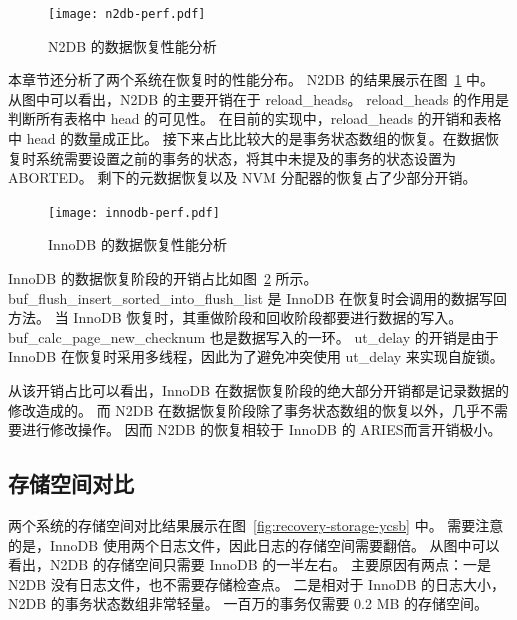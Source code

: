 \begin{figure}
    \centering
    \texttt{[image: n2db-perf.pdf]}
    \caption{N2DB 的数据恢复性能分析}
    \label{fig:recovery-n2db-perf}
\end{figure}

本章节还分析了两个系统在恢复时的性能分布。
N2DB 的结果展示在图~\ref{fig:recovery-n2db-perf} 中。
从图中可以看出，N2DB 的主要开销在于 reload\_heads。
reload\_heads 的作用是判断所有表格中 head 的可见性。
在目前的实现中，reload\_heads 的开销和表格中 head 的数量成正比。
接下来占比比较大的是事务状态数组的恢复。在数据恢复时系统需要设置之前的事务的状态，将其中未提及的事务的状态设置为 ABORTED。
剩下的元数据恢复以及 NVM 分配器的恢复占了少部分开销。

\begin{figure}
    \centering
    \texttt{[image: innodb-perf.pdf]}
    \caption{InnoDB 的数据恢复性能分析}
    \label{fig:recovery-innodb-perf}
\end{figure}


InnoDB 的数据恢复阶段的开销占比如图~\ref{fig:recovery-innodb-perf} 所示。
buf\_flush\_insert\_sorted\_into\_flush\_list 是 InnoDB 在恢复时会调用的数据写回方法。
当 InnoDB 恢复时，其重做阶段和回收阶段都要进行数据的写入。
buf\_calc\_page\_new\_checknum 也是数据写入的一环。
ut\_delay 的开销是由于 InnoDB 在恢复时采用多线程，因此为了避免冲突使用 ut\_delay 来实现自旋锁。

从该开销占比可以看出，InnoDB 在数据恢复阶段的绝大部分开销都是记录数据的修改造成的。
而 N2DB 在数据恢复阶段除了事务状态数组的恢复以外，几乎不需要进行修改操作。
因而 N2DB 的恢复相较于 InnoDB 的 ARIES而言开销极小。








\subsection{存储空间对比}

两个系统的存储空间对比结果展示在图~\ref{fig:recovery-storage-ycsb} 中。
需要注意的是，InnoDB 使用两个日志文件，因此日志的存储空间需要翻倍。
从图中可以看出，N2DB 的存储空间只需要 InnoDB 的一半左右。
主要原因有两点：一是 N2DB 没有日志文件，也不需要存储检查点。
二是相对于 InnoDB 的日志大小，N2DB 的事务状态数组非常轻量。
一百万的事务仅需要 0.2 MB 的存储空间。

